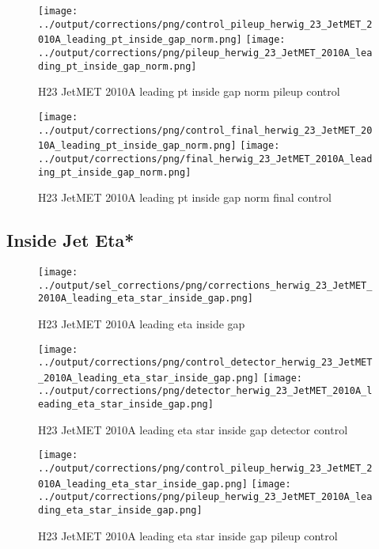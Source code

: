 \documentclass[11pt]{book}
\begin{document}
\begin{figure}[ht]
\centering
\texttt{[image: ../output/corrections/png/control\_pileup\_herwig\_23\_JetMET\_2010A\_leading\_pt\_inside\_gap\_norm.png]}
\texttt{[image: ../output/corrections/png/pileup\_herwig\_23\_JetMET\_2010A\_leading\_pt\_inside\_gap\_norm.png]}
\caption{H23 JetMET 2010A leading pt inside gap norm pileup control}
\label{fig:H23_JetMET_2010A_leading_pt_inside_gap_norm_pileup_control}
\end{figure}


\begin{figure}[ht]
\centering
\texttt{[image: ../output/corrections/png/control\_final\_herwig\_23\_JetMET\_2010A\_leading\_pt\_inside\_gap\_norm.png]}
\texttt{[image: ../output/corrections/png/final\_herwig\_23\_JetMET\_2010A\_leading\_pt\_inside\_gap\_norm.png]}
\caption{H23 JetMET 2010A leading pt inside gap norm final control}
\label{fig:H23_JetMET_2010A_leading_pt_inside_gap_norm_final_control}
\end{figure}


\clearpage
\subsection{Inside Jet Eta*}
\begin{figure}[ht]
\centering
\texttt{[image: ../output/sel\_corrections/png/corrections\_herwig\_23\_JetMET\_2010A\_leading\_eta\_star\_inside\_gap.png]}
\caption{H23 JetMET 2010A leading eta inside gap}
\label{fig:H23_JetMET_2010A_leading_eta_star_inside_gap}
\end{figure}

\begin{figure}[ht]
\centering
\texttt{[image: ../output/corrections/png/control\_detector\_herwig\_23\_JetMET\_2010A\_leading\_eta\_star\_inside\_gap.png]}
\texttt{[image: ../output/corrections/png/detector\_herwig\_23\_JetMET\_2010A\_leading\_eta\_star\_inside\_gap.png]}
\caption{H23 JetMET 2010A leading eta star inside gap detector control}
\label{fig:H23_JetMET_2010A_leading_eta_star_inside_gap_detector_control}
\end{figure}

\begin{figure}[ht]
\centering
\texttt{[image: ../output/corrections/png/control\_pileup\_herwig\_23\_JetMET\_2010A\_leading\_eta\_star\_inside\_gap.png]}
\texttt{[image: ../output/corrections/png/pileup\_herwig\_23\_JetMET\_2010A\_leading\_eta\_star\_inside\_gap.png]}
\caption{H23 JetMET 2010A leading eta star inside gap pileup control}
\label{fig:H23_JetMET_2010A_leading_eta_star_inside_gap_pileup_control}
\end{figure}
\end{document}
